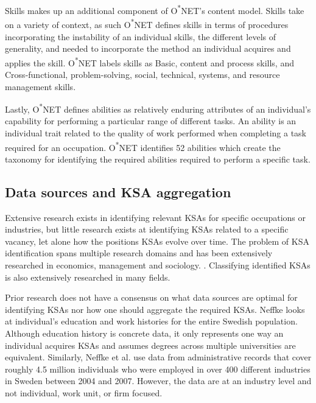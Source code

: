 \documentclass[12pt]{article}
\begin{document}
Skills makes up an additional component of O\textsuperscript{*}NET's content model. Skills take on a variety of context, as such O\textsuperscript{*}NET defines skills in terms of procedures incorporating the instability of an individual skills, the different levels of generality, and needed to incorporate the method an individual acquires and applies the skill.\cite{skills} O\textsuperscript{*}NET labels skills as Basic, content and process skills, and Cross-functional, problem-solving, social, technical, systems, and resource management skills.\cite{skills}

Lastly, O\textsuperscript{*}NET defines abilities as relatively enduring attributes of an individual's capability for performing a particular range of different tasks.\cite{abilities} An ability is an individual trait related to the quality of work performed when completing a task required for an occupation. O\textsuperscript{*}NET identifies 52 abilities which create the taxonomy for identifying the required abilities required to perform a specific task.\cite{abilities}  

\subsection{Data sources and KSA aggregation}

Extensive research exists in identifying relevant KSAs for specific occupations or industries, but little research exists at identifying KSAs related to a specific vacancy, let alone how the positions KSAs evolve over time. The problem of KSA identification spans multiple research domains and has been extensively researched in economics, management and sociology. \cite{investment_human_capital, task_specific, on_the_mechanics, diversification}. Classifying identified KSAs is also extensively researched in many fields.\cite{specialization_career,industry-specific_human_capital, human_capital_specificity} 

Prior research does not have a consensus on what data sources are optimal for identifying KSAs nor how one should aggregate the required KSAs. Neffke looks at individual's education and work histories for the entire Swedish population.\cite{value_of_complementarity} Although education history is concrete data, it only represents one way an individual acquires KSAs and assumes degrees across multiple universities are equivalent. Similarly, Neffke et al. use data from administrative records that cover roughly 4.5 million individuals who were employed in over 400 different industries in Sweden between 2004 and 2007.\cite{skill_relatedness} However, the data are at an industry level and not individual, work unit, or firm focused. 
\end{document}
